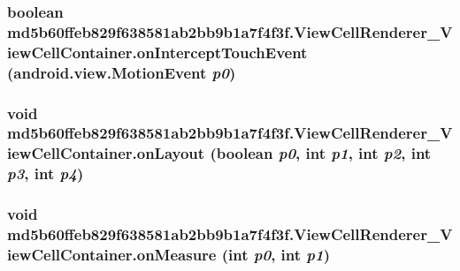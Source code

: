 \hypertarget{classmd5b60ffeb829f638581ab2bb9b1a7f4f3f_1_1_view_cell_renderer___view_cell_container_da3c5da37f05ad33b1f3e2af8acb10d1}{
\subsubsection[{onInterceptTouchEvent}]{\setlength{\rightskip}{0pt plus 5cm}boolean md5b60ffeb829f638581ab2bb9b1a7f4f3f.ViewCellRenderer\_\-ViewCellContainer.onInterceptTouchEvent (android.view.MotionEvent {\em p0})}}
\label{classmd5b60ffeb829f638581ab2bb9b1a7f4f3f_1_1_view_cell_renderer___view_cell_container_da3c5da37f05ad33b1f3e2af8acb10d1}


\hypertarget{classmd5b60ffeb829f638581ab2bb9b1a7f4f3f_1_1_view_cell_renderer___view_cell_container_980c2a52c9437398d570f602256c9687}{
\subsubsection[{onLayout}]{\setlength{\rightskip}{0pt plus 5cm}void md5b60ffeb829f638581ab2bb9b1a7f4f3f.ViewCellRenderer\_\-ViewCellContainer.onLayout (boolean {\em p0}, \/  int {\em p1}, \/  int {\em p2}, \/  int {\em p3}, \/  int {\em p4})}}
\label{classmd5b60ffeb829f638581ab2bb9b1a7f4f3f_1_1_view_cell_renderer___view_cell_container_980c2a52c9437398d570f602256c9687}


\hypertarget{classmd5b60ffeb829f638581ab2bb9b1a7f4f3f_1_1_view_cell_renderer___view_cell_container_43bfa04d9cf8132c9b32c3ae7937f7ac}{
\subsubsection[{onMeasure}]{\setlength{\rightskip}{0pt plus 5cm}void md5b60ffeb829f638581ab2bb9b1a7f4f3f.ViewCellRenderer\_\-ViewCellContainer.onMeasure (int {\em p0}, \/  int {\em p1})}}
\label{classmd5b60ffeb829f638581ab2bb9b1a7f4f3f_1_1_view_cell_renderer___view_cell_container_43bfa04d9cf8132c9b32c3ae7937f7ac}




